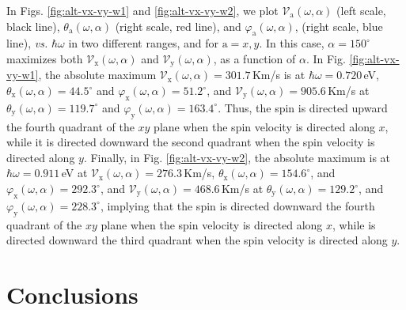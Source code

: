 \documentclass[floatfix,prb,aps,superscriptaddress,showpacs,11pt,preprint,letterpaper]{revtex4}
\begin{document}
In Figs. \ref{fig:alt-vx-vy-w1} and \ref{fig:alt-vx-vy-w2}, we plot
$\mathcal{V}_{\mathrm{a}} (\omega,\alpha)$ (left scale, black line),
$\theta_{\mathrm{a}} (\omega,\alpha)$ (right scale, red line), and
$\varphi_{\mathrm{a}} (\omega,\alpha)$, (right scale, blue line), {\it vs.}
$\hbar\omega$ in two different ranges, and  for $\mathrm{a}=x,y$. In this case,
$\alpha=150^\circ$  maximizes both $\mathcal{V}_{\mathrm{x}} (\omega,\alpha)$
and $\mathcal{V}_{\mathrm{y}} (\omega,\alpha)$, as a function of $\alpha$. In
Fig. \ref{fig:alt-vx-vy-w1}, the absolute maximum $\mathcal{V}_{\mathrm{x}}
(\omega,\alpha) = 301.7$\,Km/s is at $\hbar\omega=0.720$\,eV,
$\theta_{\mathrm{x}} (\omega,\alpha) = 44.5^{\circ}$ and
$\varphi_{\mathrm{x}}(\omega,\alpha) = 51.2^{\circ}$, and
$\mathcal{V}_{\mathrm{y}} (\omega,\alpha) = 905.6$\,Km/s at
$\theta_{\mathrm{y}} (\omega,\alpha) = 119.7^{\circ}$ and
$\varphi_{\mathrm{y}}(\omega,\alpha) = 163.4^{\circ}$. Thus, the spin is
directed upward the fourth quadrant of the $xy$ plane when the spin
velocity is directed along $x$, while it is directed downward the second
quadrant when the spin velocity is directed along $y$. 
Finally, in
Fig. \ref{fig:alt-vx-vy-w2}, the absolute maximum is at $\hbar\omega=0.911$\,eV
at $\mathcal{V}_{\mathrm{x}} (\omega,\alpha) = 276.3$\,Km/s,
$\theta_{\mathrm{x}} (\omega,\alpha) = 154.6^{\circ}$, and
$\varphi_{\mathrm{x}}(\omega,\alpha) = 292.3^{\circ}$, and
$\mathcal{V}_{\mathrm{y}} (\omega,\alpha) = 468.6$\,Km/s at
$\theta_{\mathrm{y}} (\omega,\alpha) = 129.2^{\circ}$, and
$\varphi_{\mathrm{y}}(\omega,\alpha) = 228.3^{\circ}$, implying that the spin
is directed downward the fourth quadrant of the $xy$ plane when the
spin velocity is directed along $x$, while is directed downward the third
quadrant when the spin velocity is directed along $y$.

\section{Conclusions}
\label{sec:conclusions}
\end{document}
